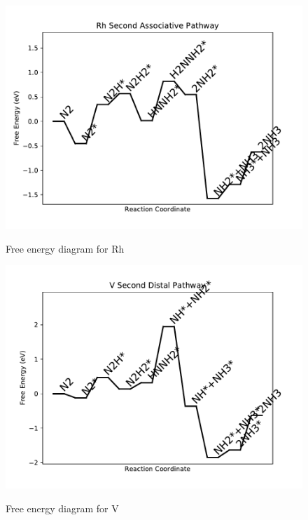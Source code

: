 \documentclass[journal=jacsat,manuscript=article]{achemso}
\begin{document}
\begin{figure}
\includegraphics[width=1\linewidth]{data/plots/Rh_associative_2.pdf}
\label{fig:Rh_associative_2}
\caption{Free energy diagram for Rh}
\end{figure}

\newpage
\begin{figure}
\includegraphics[width=1\linewidth]{data/plots/V_distal_2.pdf}
\label{fig:V_distal_2}
\caption{Free energy diagram for V}
\end{figure}
\end{document}
